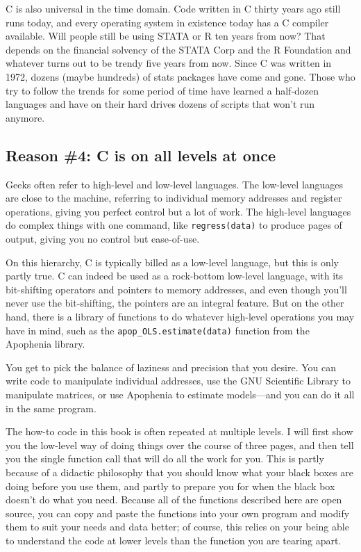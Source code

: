 C is also universal in the time domain. Code written in C thirty years
ago still runs today, and every operating system in existence today has a C
compiler available. Will people still be using STATA or R ten years from now?
That depends on the financial solvency of the STATA Corp and the
R Foundation and whatever turns out to be trendy five years from now.
Since C was written in 1972, dozens (maybe hundreds) of stats packages
have come and gone. Those who try to follow the trends for
some period of time have learned a half-dozen languages
and have on their hard drives dozens of scripts that won't run anymore.


\ifbook
\subsection{Reason \#4: C is on all levels at once} 
Geeks often refer to high-level and low-level languages. The low-level
languages are close to the machine, referring to individual memory
addresses and register operations, giving you perfect control but a lot
of work. The high-level languages do
complex things with one command, like {\tt regress(data)} to produce
pages of output, giving you no control but ease-of-use.

On this hierarchy, C is typically billed as a low-level language, but this is only
partly true. C can indeed be used as a rock-bottom low-level language,
with its bit-shifting operators and pointers to memory addresses, and
even though you'll never use the bit-shifting, the pointers are an
integral feature. But on the other hand, there is a library of functions
to do whatever high-level operations you may have in mind, such as the
{\tt apop\_OLS.estimate(data)} function from the Apophenia library.

You get to pick the balance of laziness and precision that you desire. You
can write code to manipulate individual addresses, use the GNU Scientific
Library to manipulate matrices, or use Apophenia to estimate models---and
you can do it all in the same program.

The how-to code in this book is often repeated at multiple levels. I will first
show you the low-level way of doing things over the course of three
pages, and then tell you the single function call that will do all the work
for you. This is partly because of a didactic philosophy that you should
know what your black boxes are doing before you use them, and partly
to prepare you for when the black box doesn't do what you need. Because all of the
functions described here are open source, you can copy and paste the
functions into your own program and modify them to suit your needs
and data better; of course, this relies on your being able to understand
the code at lower levels than the function you are tearing apart.
\fi
